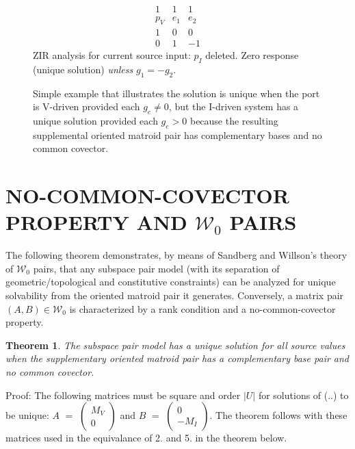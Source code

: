 \documentclass{article}
\newtheorem{theorem}{Theorem}
\newcommand{\extra}[1]{{\small{#1}}}
\begin{document}
{\begin{figure}[htb]
\begin{minipage}[b]{.48\linewidth}
\[\begin{array}{ccc}
1   &  1  &  1  \\ \hline
p_V & e_1 & e_2 \\ \hline
1   &  0  &  0  \\
0   &  1  &  -1
\end{array}
\]
ZIR analysis for current source input:
$p_I$ deleted.
Zero response (unique solution) \textit{unless}
$g_1 = -g_2$.  
\end{minipage}
\caption{Simple example that illustrates the solution is unique when the 
port is V-driven provided each $g_e\neq 0$, but the I-driven system has a
unique solution provided each $g_e>0$ because the resulting supplemental
oriented matroid pair has complementary bases and no common covector.}
\label{Simple}
%
\end{figure}
}

\section{NO-COMMON-COVECTOR PROPERTY AND $\mathcal{W}_0$ PAIRS}

The following theorem
demonstrates, by means of Sandberg and Willson's theory of 
$\mathcal{W}_0$ pairs, that any 
subspace pair model 
\extra{(with  its separation of
geometric/topological and constitutive constraints)}
can be analyzed
for unique solvability from the oriented matroid pair it generates.
Conversely, a matrix pair 
$(A,B)\in\mathcal{W}_0$ is characterized by a rank condition and a 
no-common-covector property.

\begin{theorem}
The subspace pair model has a unique solution for all source 
values when the supplementary oriented matroid pair has a complementary 
base pair and no common covector.
\end{theorem}

Proof:  The following matrices must be square and order $|U|$
for solutions of (..) to be unique:
$A$ $=$ $\left(\begin{array}{c}M_V\\ 0\end{array}\right)$ and
$B$ $=$ $\left(\begin{array}{c}0\\ -M_I\end{array}\right)$.
The theorem follows with these matrices used in the equivalance of 
2. and 5. in the theorem below.
\end{document}
